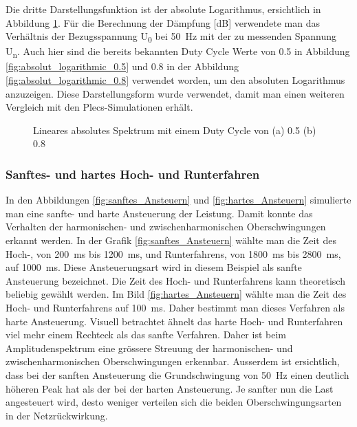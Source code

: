 Die dritte Darstellungsfunktion ist der absolute Logarithmus, ersichtlich in Abbildung \ref{fig:absolut_logaritmic_matlab}. Für die Berechnung der Dämpfung [dB] verwendete man das Verhältnis der Bezugsspannung U\textsubscript{0} bei \SI{50}{Hz} mit der zu messenden Spannung U\textsubscript{n}. Auch hier sind die bereits bekannten Duty Cycle Werte von 0.5 in Abbildung  \ref{fig:absolut_logarithmic_0.5} und 0.8 in der Abbildung \ref{fig:absolut_logarithmic_0.8} verwendet worden, um den absoluten Logarithmus anzuzeigen. Diese Darstellungsform  wurde verwendet, damit man einen weiteren Vergleich mit den Plecs-Simulationen erhält.


\begin{figure}[ht!]
	\centering
	\qquad
	\caption{Lineares absolutes Spektrum mit einem Duty Cycle von (a) 0.5 (b) 0.8}
	\label{fig:absolut_logaritmic_matlab}
\end{figure}

\subsubsection{Sanftes- und hartes Hoch- und Runterfahren}\label{sec:sanftes_hoch_und_runterfahren}

In den Abbildungen \ref{fig:sanftes_Ansteuern} und \ref{fig:hartes_Ansteuern} simulierte man eine sanfte- und harte Ansteuerung der Leistung. Damit konnte das Verhalten der harmonischen- und zwischenharmonischen Oberschwingungen erkannt werden. In der Grafik \ref{fig:sanftes_Ansteuern} wählte man die Zeit des Hoch-, von \SI{200}{ms} bis \SI{1200}{ms}, und Runterfahrens, von \SI{1800}{ms} bis \SI{2800}{ms}, auf \SI{1000}{ms}. Diese Ansteuerungsart wird in diesem Beispiel als sanfte Ansteuerung bezeichnet. Die Zeit des Hoch- und Runterfahrens kann theoretisch beliebig gewählt werden. Im Bild \ref{fig:hartes_Ansteuern} wählte man die Zeit des Hoch- und Runterfahrens auf \SI{100}{ms}. Daher bestimmt man dieses Verfahren als harte Ansteuerung. 
\newpage
Visuell betrachtet ähnelt das harte Hoch- und Runterfahren viel mehr einem Rechteck als das sanfte Verfahren. Daher ist beim Amplitudenspektrum eine grössere Streuung der harmonischen- und zwischenharmonischen Oberschwingungen erkennbar. Ausserdem ist ersichtlich, dass bei der sanften Ansteuerung die Grundschwingung von \SI{50}{Hz} einen deutlich höheren Peak hat als der bei der harten Ansteuerung. Je sanfter nun die Last angesteuert wird, desto weniger verteilen sich die beiden Oberschwingungsarten in der Netzrückwirkung.


